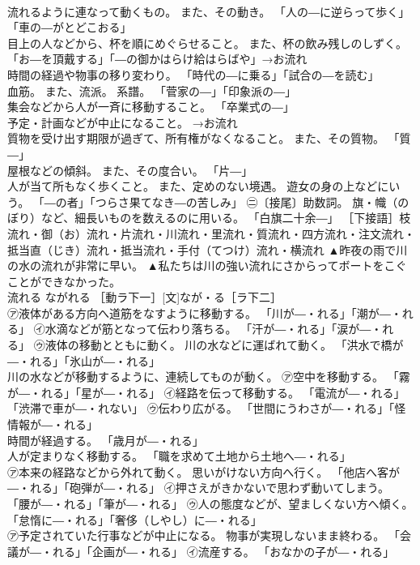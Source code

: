 \documentclass[8pt]{extreport}
\begin{document}
\begin{CJK}{UTF8}{min}
\\	流れるように連なって動くもの。 また、その動き。 「人の―に逆らって歩く」「車の―がとどこおる」 
\\	目上の人などから、杯を順にめぐらせること。 また、杯の飲み残しのしずく。 「お―を頂戴する」「―の御かはらけ給はらばや」→お流れ 
\\	時間の経過や物事の移り変わり。 「時代の―に乗る」「試合の―を読む」 
\\	血筋。 また、流派。 系譜。 「菅家の―」「印象派の―」 
\\	集会などから人が一斉に移動すること。 「卒業式の―」 
\\	予定・計画などが中止になること。 →お流れ 
\\	質物を受け出す期限が過ぎて、所有権がなくなること。 また、その質物。 「質―」 
\\	屋根などの傾斜。 また、その度合い。 「片―」 
\\	人が当て所もなく歩くこと。 また、定めのない境遇。 遊女の身の上などにいう。 「―の者」「つらさ果てなき―の苦しみ」 ㊁〔接尾〕助数詞。 旗・幟（のぼり）など、細長いものを数えるのに用いる。 「白旗二十余―」 ［下接語］枝流れ・御（お）流れ・片流れ・川流れ・里流れ・質流れ・四方流れ・注文流れ・抵当直（じき）流れ・抵当流れ・手付（てつけ）流れ・横流れ	▲昨夜の雨で川の水の流れが非常に早い。 ▲私たちは川の強い流れにさからってボートをこぐことができなかった。
\\	流れる	ながれる	［動ラ下一］[文]なが・る［ラ下二］ 
\\	㋐液体がある方向へ道筋をなすように移動する。 「川が―・れる」「潮が―・れる」 ㋑水滴などが筋となって伝わり落ちる。 「汗が―・れる」「涙が―・れる」 ㋒液体の移動とともに動く。 川の水などに運ばれて動く。 「洪水で橋が―・れる」「氷山が―・れる」 
\\	川の水などが移動するように、連続してものが動く。 ㋐空中を移動する。 「霧が―・れる」「星が―・れる」 ㋑経路を伝って移動する。 「電流が―・れる」「渋滞で車が―・れない」 ㋒伝わり広がる。 「世間にうわさが―・れる」「怪情報が―・れる」 
\\	時間が経過する。 「歳月が―・れる」 
\\	人が定まりなく移動する。 「職を求めて土地から土地へ―・れる」 
\\	㋐本来の経路などから外れて動く。 思いがけない方向へ行く。 「他店へ客が―・れる」「砲弾が―・れる」 ㋑押さえがきかないで思わず動いてしまう。 「腰が―・れる」「筆が―・れる」 ㋒人の態度などが、望ましくない方へ傾く。 「怠惰に―・れる」「奢侈（しやし）に―・れる」 
\\	㋐予定されていた行事などが中止になる。 物事が実現しないまま終わる。 「会議が―・れる」「企画が―・れる」 ㋑流産する。 「おなかの子が―・れる」 

\end{CJK}
\end{document}
